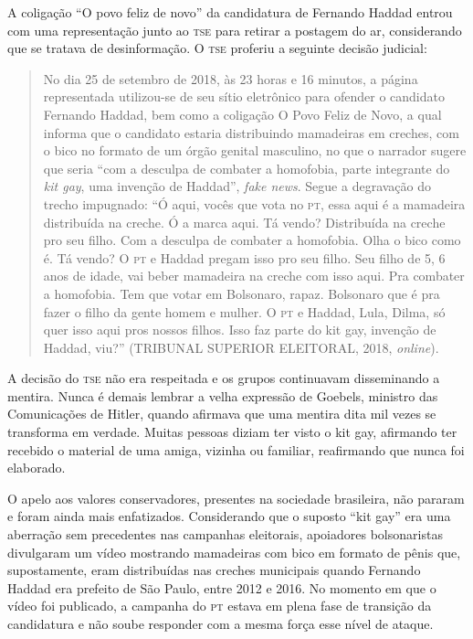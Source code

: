 A coligação ``O povo feliz de novo'' da candidatura de Fernando Haddad
entrou com uma representação junto ao \textsc{\textsc{tse}}
para retirar a postagem do ar, considerando que se tratava de
desinformação. O \textsc{\textsc{tse}} proferiu a seguinte decisão judicial:

\begin{quote}
No dia 25 de setembro de 2018, às 23 horas e 16 minutos, a página representada
utilizou-se de seu sítio eletrônico para ofender o candidato Fernando
Haddad, bem como a coligação O Povo Feliz de Novo, a qual informa que o
candidato estaria distribuindo mamadeiras em creches, com o bico no
formato de um órgão genital masculino, no que o narrador sugere que
seria ``com a desculpa de combater a homofobia, parte integrante do \textit{kit
gay}, uma invenção de Haddad'', \textit{fake news}. Segue a degravação do trecho
impugnado: ``Ó aqui, vocês que vota no \textsc{pt}, essa aqui é a mamadeira
distribuída na creche. Ó a marca aqui. Tá vendo? Distribuída na creche
pro seu filho. Com a desculpa de combater a homofobia. Olha o bico como
é. Tá vendo? O \textsc{pt} e Haddad pregam isso pro seu filho. Seu filho de 5, 6
anos de idade, vai beber mamadeira na creche com isso aqui. Pra combater
a homofobia. Tem que votar em Bolsonaro, rapaz. Bolsonaro que é pra
fazer o filho da gente homem e mulher. O \textsc{pt} e Haddad, Lula, Dilma, só
quer isso aqui pros nossos filhos. Isso faz parte do kit gay, invenção
de Haddad, viu?'' (TRIBUNAL SUPERIOR ELEITORAL, 2018, \textit{online}).
\end{quote}

A decisão do \textsc{tse} não era respeitada e os grupos continuavam disseminando
a mentira. Nunca é demais lembrar a velha expressão de Goebels, ministro
das Comunicações de Hitler, quando afirmava que uma mentira dita mil
vezes se transforma em verdade. Muitas pessoas diziam ter visto o kit
gay, afirmando ter recebido o material de uma amiga, vizinha ou
familiar, reafirmando que nunca foi elaborado.

O apelo aos valores conservadores, presentes na sociedade brasileira,
não pararam e foram ainda mais enfatizados. Considerando que o suposto
``kit gay'' era uma aberração sem precedentes nas campanhas eleitorais,
apoiadores bolsonaristas divulgaram um vídeo mostrando mamadeiras com
bico em formato de pênis que, supostamente, eram distribuídas nas
creches municipais quando Fernando Haddad era prefeito de São Paulo,
entre 2012 e 2016. No momento em que o vídeo foi publicado, a campanha
do \textsc{pt} estava em plena fase de transição da
candidatura e não soube responder com a mesma força esse nível de
ataque.

